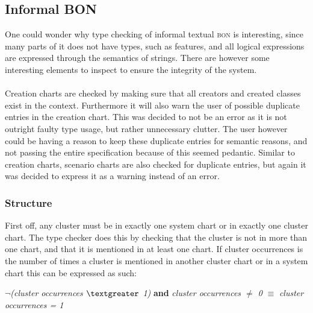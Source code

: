 \subsection{Informal BON}
One could wonder why type checking of informal textual \textsc{bon} is interesting, since many parts of it does not have types, such as features, and all logical expressions are expressed through the semantics of strings. There are however some interesting elements to inspect to ensure the integrity of the system.

\paragraph{}
Creation charts are checked by making sure that all creators and created classes exist in the context. Furthermore it will also warn the user of possible duplicate entries in the creation chart. This was decided to not be an error as it is not outright faulty type usage, but rather unnecessary clutter. The user however could be having a reason to keep these duplicate entries for semantic reasons, and not passing the entire specification because of this seemed pedantic. Similar to creation charts, scenario charts are also checked for duplicate entries, but again it was decided to express it as a warning instead of an error. 

\subsubsection{Structure}
First off, any cluster must be in exactly one system chart or in exactly one cluster chart. The type checker does this by checking that the cluster is not in more than one chart, and that it is mentioned in at least one chart. If cluster occurrences is the number of times a cluster is mentioned in another cluster chart or in a system chart this can be expressed as such: 
{\footnotesize\begin{center} $\neg$\textit{(cluster occurrences $\textgreater$ 1)} \textbf{and}   \textit{cluster occurrences $\neq$ 0} \textit{} $\equiv$  \textit{cluster occurrences = 1}
\end{center}}
